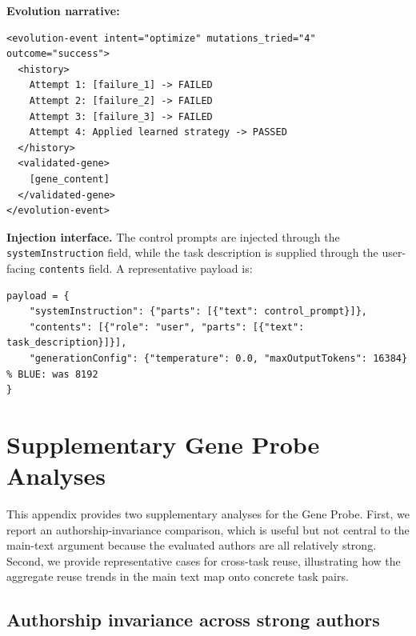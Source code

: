 \documentclass{article}
\newcommand{\nbf}[1]{{\noindent \textbf{#1}}}
\begin{document}
\nbf{Evolution narrative:}
\begin{verbatim}
<evolution-event intent="optimize" mutations_tried="4" outcome="success">
  <history>
    Attempt 1: [failure_1] -> FAILED
    Attempt 2: [failure_2] -> FAILED
    Attempt 3: [failure_3] -> FAILED
    Attempt 4: Applied learned strategy -> PASSED
  </history>
  <validated-gene>
    [gene_content]
  </validated-gene>
</evolution-event>
\end{verbatim}

\nbf{Injection interface.}
The control prompts are injected through the \texttt{systemInstruction} field, while the task description is supplied through the user-facing \texttt{contents} field. 
A representative payload is:

\begin{verbatim}
payload = {
    "systemInstruction": {"parts": [{"text": control_prompt}]},
    "contents": [{"role": "user", "parts": [{"text": task_description}]}],
    "generationConfig": {"temperature": 0.0, "maxOutputTokens": 16384}  % BLUE: was 8192
}
\end{verbatim}

\section{Supplementary Gene Probe Analyses}
\label{app:gene_supplementary}

This appendix provides two supplementary analyses for the Gene Probe.
First, we report an authorship-invariance comparison, which is useful but not central to the main-text argument because the evaluated authors are all relatively strong.
Second, we provide representative cases for cross-task reuse, illustrating how the aggregate reuse trends in the main text map onto concrete task pairs.

\subsection{Authorship invariance across strong authors}
\label{app:gene_authors}
\end{document}
